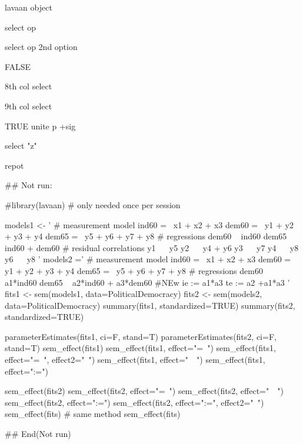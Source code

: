 \documentclass[a4paper]{book}
\begin{document}
%
\begin{Arguments}
\begin{ldescription}
\item[\code{model\_sem}] lavaan object

\item[\code{effect}] select op

\item[\code{effect2}] select op 2nd option

\item[\code{ci}] FALSE

\item[\code{lower}] 8th col select

\item[\code{upper}] 9th col select

\item[\code{unite}] TRUE unite p +sig

\item[\code{unite\_col}] select "z"
\end{ldescription}
\end{Arguments}
%
\begin{Value}
repot
\end{Value}
%
\begin{Examples}
\begin{ExampleCode}
## Not run: 

 #library(lavaan) # only needed once per session

models1 <- '
  # measurement model
    ind60 =~ x1 + x2 + x3
    dem60 =~ y1 + y2 + y3 + y4
    dem65 =~ y5 + y6 + y7 + y8
    # regressions
    dem60 ~ ind60
    dem65 ~ ind60 + dem60
      # residual correlations
    y1 ~~ y5
    y2 ~~ y4 + y6
    y3 ~~ y7
    y4 ~~ y8
    y6 ~~ y8
'
models2 ='
  # measurement model
    ind60 =~ x1 + x2 + x3
    dem60 =~ y1 + y2 + y3 + y4
    dem65 =~ y5 + y6 + y7 + y8
     # regressions
    dem60 ~ a1*ind60
    dem65 ~ a2*ind60 + a3*dem60
 #NEw
   ie := a1*a3
   te := a2 +a1*a3
'
fits1 <- sem(models1, data=PoliticalDemocracy)
fits2 <- sem(models2, data=PoliticalDemocracy)
summary(fits1, standardized=TRUE)
summary(fits2, standardized=TRUE)

parameterEstimates(fits1, ci=F, stand=T)
parameterEstimates(fits2, ci=F, stand=T)
sem_effect(fits1)
sem_effect(fits1, effect="=~")
sem_effect(fits1, effect="=~", effect2="~")
sem_effect(fits1, effect="~~")
sem_effect(fits1, effect=":=")

sem_effect(fits2)
sem_effect(fits2, effect="=~")
sem_effect(fits2, effect="~~")
sem_effect(fits2, effect=":=")
sem_effect(fits2, effect=":=", effect2="~")
 sem_effect(fits)%
 # same method
 sem_effect(fits)%


## End(Not run)


\end{ExampleCode}
\end{Examples}
\end{document}
